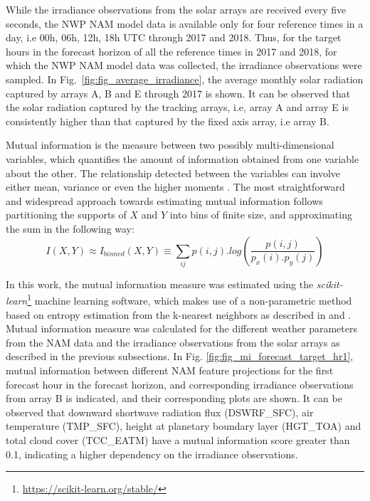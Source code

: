 While the irradiance observations from the solar arrays are received every five seconds, the NWP NAM model data is available only for four reference times in a day, i.e 00h, 06h, 12h, 18h UTC through 2017 and 2018. Thus, for the target hours in the forecast horizon of all the reference times in 2017 and 2018, for which the NWP NAM model data was collected, the irradiance observations were sampled. In Fig.~\ref{fig:fig_average_irradiance}, the average monthly solar radiation captured by arrays A, B and E through 2017 is shown. It can be observed that the solar radiation captured by the tracking arrays, i.e, array A and array E is consistently higher than that captured by the fixed axis array, i.e array B.

\par Mutual information is the measure between two possibly multi-dimensional variables, which quantifies the amount of information obtained from one variable about the other. The relationship detected between the variables can involve either mean, variance or even the higher moments \cite{feature_selection_mi}. The most straightforward and widespread approach towards estimating mutual information follows partitioning the supports of $X$ and $Y$ into bins of finite size, and approximating the sum in the following way:
\begin{equation}\label{eq:eq_mi}
I(X, Y) \approx I_{binned}(X, Y) \equiv \sum_{ij} p(i, j) . log(\frac{p(i, j)}{p_x(i).p_y(j)})
\end{equation}

In this work, the mutual information measure was estimated using the \textit{scikit-learn}\footnote{\url{https://scikit-learn.org/stable/}} machine learning software, which makes use of a non-parametric method based on entropy estimation from the k-nearest neighbors as described in \cite{feature_selection_mi} and \cite{feature_selection_mi2}. Mutual information measure was calculated for the different weather parameters from the NAM data and the irradiance observations from the solar arrays as described in the previous subsections. In Fig. \ref{fig:fig_mi_forecast_target_hr1}, mutual information between different NAM feature projections for the first forecast hour in the forecast horizon, and corresponding irradiance observations from array B is indicated, and their corresponding plots are shown. It can be observed that downward shortwave radiation flux (DSWRF\_SFC), air temperature (TMP\_SFC), height at planetary boundary layer (HGT\_TOA) and total cloud cover (TCC\_EATM) have a mutual information score greater than 0.1, indicating a higher dependency on the irradiance observations. 

